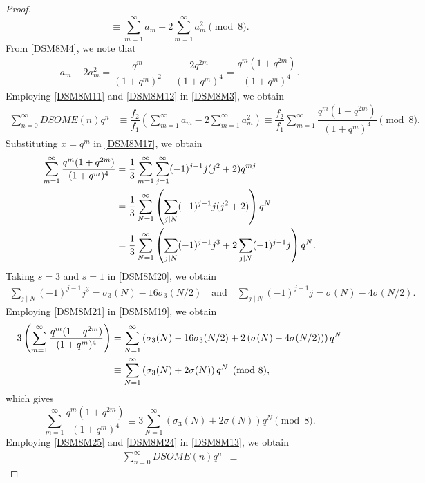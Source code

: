 \documentclass[10pt,a4paper]{amsart}
\begin{document}
\begin{proof}
\begin{equation}
\equiv
\sum_{m=1}^{\infty}a_m
-
2\sum_{m=1}^{\infty}a_m^2
\pmod8.
\end{equation}
From  \eqref{DSM8M4}, we note that 
\begin{align}
a_m-2a_m^2
=
\dfrac{q^m}{(1+q^m)^2}
-
\dfrac{2q^{2m}}{(1+q^m)^4}
=
\dfrac{q^m(1+q^{2m})}{(1+q^m)^4}.
\label{DSM8M12}
\end{align}
Employing  \eqref{DSM8M11} and
\eqref{DSM8M12} in \eqref{DSM8M3}, we obtain
\begin{align}
\sum_{n=0}^{\infty}DSOME(n)q^n
&\equiv
\dfrac{f_2}{f_1}
\left(
\sum_{m=1}^{\infty}a_m
-
2\sum_{m=1}^{\infty}a_m^2
\right)
\equiv
\dfrac{f_2}{f_1}
\sum_{m=1}^{\infty}
\dfrac{q^m(1+q^{2m})}{(1+q^m)^4}
\pmod8.
\label{DSM8M13}
\end{align}
Substituting $x=q^m$ in \eqref{DSM8M17}, we obtain
\begin{align}
\sum_{m=1}^{\infty}
\dfrac{q^m(1+q^{2m})}{(1+q^m)^4}
&=
\dfrac{1}{3}
\sum_{m=1}^{\infty}
\sum_{j=1}^{\infty}
(-1)^{j-1}j(j^2+2)q^{mj}
\notag\\
&=
\dfrac{1}{3}
\sum_{N=1}^{\infty}
\left(
\sum_{j\mid N}
(-1)^{j-1}j(j^2+2)
\right)q^N
\notag\\
&\label{DSM8M19}=
\dfrac{1}{3}
\sum_{N=1}^{\infty}
\left(
\sum_{j\mid N}(-1)^{j-1}j^3
+
2\sum_{j\mid N}(-1)^{j-1}j
\right)q^N.
\end{align}
Taking $s=3$ and $s=1$ in \eqref{DSM8M20}, we obtain
\begin{align}
\sum_{j\mid N}(-1)^{j-1}j^3
=
\sigma_3(N)-16\sigma_3(N/2)\quad 
\text{and}\quad 
\sum_{j\mid N}(-1)^{j-1}j
=
\sigma(N)-4\sigma(N/2).
\label{DSM8M21}
\end{align}
Employing \eqref{DSM8M21} in \eqref{DSM8M19}, we obtain
\begin{align}
3
\left(
\sum_{m=1}^{\infty}
\dfrac{q^m(1+q^{2m})}{(1+q^m)^4}
\right)
&=
\sum_{N=1}^{\infty}\left(\sigma_3(N)-16\sigma_3(N/2)+
2\left(
\sigma(N)-4\sigma(N/2)
\right)\right)q^N
\notag\\
&\equiv
\sum_{N=1}^{\infty}\left(\sigma_3(N)+2\sigma(N)\right)q^N
\pmod8,\notag
\end{align}
which gives
\begin{equation}\label{DSM8M24}
\sum_{m=1}^{\infty}
\dfrac{q^m(1+q^{2m})}{(1+q^m)^4}
\equiv
3\sum_{N=1}^{\infty}
\left(
\sigma_3(N)+2\sigma(N)
\right)q^N
\pmod8.
\end{equation}
Employing  \eqref{DSM8M25} and \eqref{DSM8M24} in \eqref{DSM8M13}, we obtain
\begin{align}
\sum_{n=0}^{\infty}DSOME(n)q^n
&\equiv

\end{align}
\end{proof}
\end{document}
